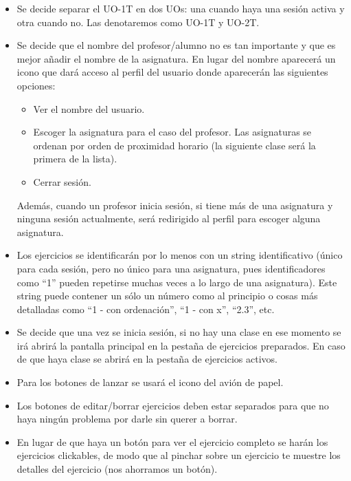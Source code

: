 \begin{itemize}
\item Se decide separar el UO-1T en dos UOs: una cuando haya una sesión activa y otra cuando no. Las denotaremos como UO-1T y UO-2T.

\item Se decide que el nombre del profesor/alumno no es tan importante y que es mejor añadir el nombre de la asignatura. En lugar del nombre aparecerá un icono que dará acceso al perfil del usuario donde aparecerán las siguientes opciones:
\begin{itemize}
	\item Ver el nombre del usuario.
	\item Escoger la asignatura para el caso del profesor. Las asignaturas se ordenan por orden de proximidad horario (la 		siguiente clase será la primera de la lista).
	\item Cerrar sesión.
\end{itemize}
Además, cuando un profesor inicia sesión, si tiene más de una asignatura y ninguna sesión actualmente, será redirigido al perfil para escoger alguna asignatura.

\item Los ejercicios se identificarán por lo menos con un string identificativo (único para cada sesión, pero no único para una asignatura, pues identificadores como “1” pueden repetirse muchas veces a lo largo de una asignatura). Este string puede contener un sólo un número como al principio o cosas más detalladas como “1 - con ordenación”, “1 - con x”, “2.3”, etc.

\item Se decide que una vez se inicia sesión, si no hay una clase en ese momento se irá abrirá la pantalla principal en la pestaña de ejercicios preparados. En caso de que haya clase se abrirá en la pestaña de ejercicios activos.

\item Para los botones de lanzar se usará el icono del avión de papel.

\item Los botones de editar/borrar ejercicios deben estar separados para que no haya ningún problema por darle sin querer a borrar.

\item En lugar de que haya un botón para ver el ejercicio completo se harán los ejercicios clickables, de modo que al pinchar sobre un ejercicio te muestre los detalles del ejercicio (nos ahorramos un botón).


\end{itemize}
